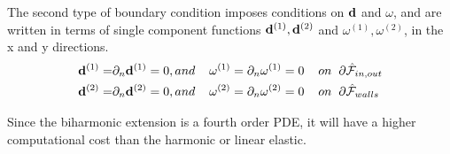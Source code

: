 The second type of boundary condition imposes conditions on $\bold{d}$ and $\omega$, and are written in terms of single component functions $\bold{d}^{(1)},\bold{d}^{(2)}$ and $\omega^{(1)}, \omega^{(2)}$, in the x and y directions.	
\begin{align}
\bold{d}^{(1)} =& \partial_n \bold{d}^{(1)} = 0 , and \hspace{4mm}   \omega^{(1)} = \partial_n \omega^{(1)} = 0    \hspace{4mm} on \hspace{2mm} \partial \hat{\mathcal{F}}_{in,out} \\
\bold{d}^{(2)} =& \partial_n \bold{d}^{(2)} = 0 , and \hspace{4mm}   \omega^{(2)} = \partial_n \omega^{(2)} = 0    \hspace{4mm} on \hspace{2mm} \partial \hat{\mathcal{F}}_{walls} \\
\end{align}

Since the biharmonic extension is a fourth order PDE, it will have a higher computational cost \cite{Richter2010} than the harmonic or linear elastic. 

